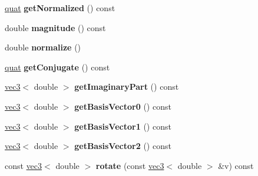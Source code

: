 \begin{DoxyCompactItemize}
\item 
\hypertarget{classmath_1_1quat_aa3d1bb2f539e50c692f955f40e05bd23}{
\hyperlink{classmath_1_1quat}{quat} {\bfseries getNormalized} () const }
\label{classmath_1_1quat_aa3d1bb2f539e50c692f955f40e05bd23}

\item 
\hypertarget{classmath_1_1quat_afc9da36b57a5fd6f678ce0b5acd10fee}{
double {\bfseries magnitude} () const }
\label{classmath_1_1quat_afc9da36b57a5fd6f678ce0b5acd10fee}

\item 
\hypertarget{classmath_1_1quat_a1ba0f12c4c6b8cc2090b4d5ea91e39a2}{
double {\bfseries normalize} ()}
\label{classmath_1_1quat_a1ba0f12c4c6b8cc2090b4d5ea91e39a2}

\item 
\hypertarget{classmath_1_1quat_aaa518b97b4b1de62a2bf341239061b08}{
\hyperlink{classmath_1_1quat}{quat} {\bfseries getConjugate} () const }
\label{classmath_1_1quat_aaa518b97b4b1de62a2bf341239061b08}

\item 
\hypertarget{classmath_1_1quat_a6e6d2a97e1fc2e75385702f96ea8644e}{
\hyperlink{classmath_1_1vec3}{vec3}$<$ double $>$ {\bfseries getImaginaryPart} () const }
\label{classmath_1_1quat_a6e6d2a97e1fc2e75385702f96ea8644e}

\item 
\hypertarget{classmath_1_1quat_a3ee5806c2c8003c20b8accd50f2b8514}{
\hyperlink{classmath_1_1vec3}{vec3}$<$ double $>$ {\bfseries getBasisVector0} () const }
\label{classmath_1_1quat_a3ee5806c2c8003c20b8accd50f2b8514}

\item 
\hypertarget{classmath_1_1quat_a486e21af4f600a4f2d972cc782c92f47}{
\hyperlink{classmath_1_1vec3}{vec3}$<$ double $>$ {\bfseries getBasisVector1} () const }
\label{classmath_1_1quat_a486e21af4f600a4f2d972cc782c92f47}

\item 
\hypertarget{classmath_1_1quat_a4d96d1cec1f48b5e6c76e1b6fd84084e}{
\hyperlink{classmath_1_1vec3}{vec3}$<$ double $>$ {\bfseries getBasisVector2} () const }
\label{classmath_1_1quat_a4d96d1cec1f48b5e6c76e1b6fd84084e}

\item 
\hypertarget{classmath_1_1quat_a6c3e3277474838d174a45d61a776c797}{
const \hyperlink{classmath_1_1vec3}{vec3}$<$ double $>$ {\bfseries rotate} (const \hyperlink{classmath_1_1vec3}{vec3}$<$ double $>$ \&v) const }
\label{classmath_1_1quat_a6c3e3277474838d174a45d61a776c797}


\end{DoxyCompactItemize}
